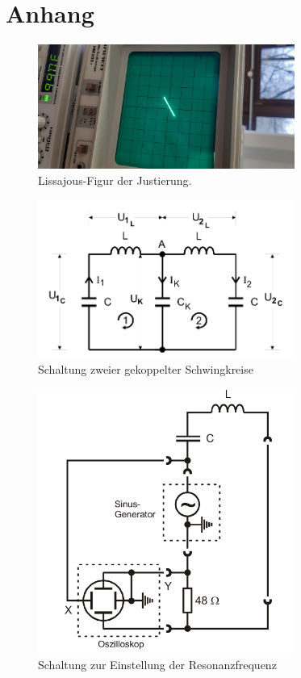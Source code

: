 \pagebreak
\section{Anhang}
\label{sec:anhang}

\begin{figure}
    \centering
    \includegraphics[width=0.75\textwidth, angle=-90]{plots/Lissajour-Gerade.jpeg}
    \caption{Lissajous-Figur der Justierung.}
    \label{fig:Lissajous}
\end{figure}


\begin{figure}
    \centering
    \includegraphics[width=0.75\textwidth]{plots/Schaltung2.png}
    \caption{Schaltung zweier gekoppelter Schwingkreise \cite{Versuchsanleitung}}
    \label{fig:schaltung2}
\end{figure}


\begin{figure}
    \centering
    \includegraphics[width=0.75\textwidth]{plots/Schaltung0.png}
    \caption{Schaltung zur Einstellung der Resonanzfrequenz \cite{Versuchsanleitung}}
    \label{fig:schaltung0}
\end{figure}

